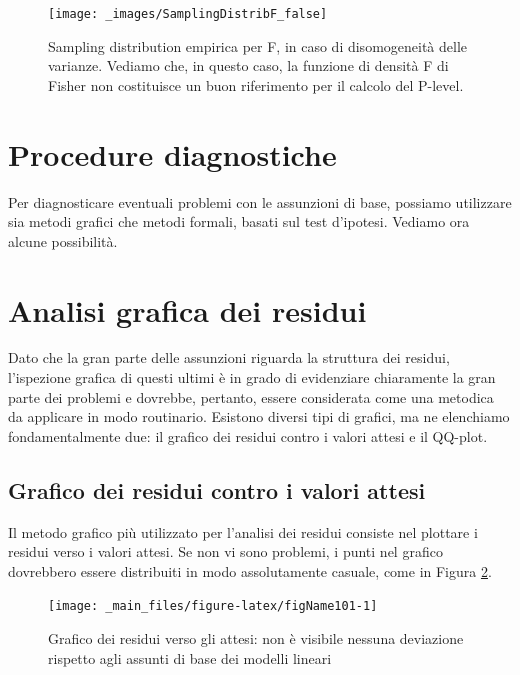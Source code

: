 \documentclass[a4paper,12pt,oneside]{book}
\begin{document}
\begin{figure}

{\centering \texttt{[image: \_images/SamplingDistribF\_false]} 

}

\caption{Sampling distribution empirica per F, in caso di disomogeneità delle varianze. Vediamo che, in questo caso, la funzione di densità F di Fisher non costituisce un buon riferimento per il calcolo del P-level.}\label{fig:figName101a}
\end{figure}

\hypertarget{procedure-diagnostiche}{%
\section{Procedure diagnostiche}\label{procedure-diagnostiche}}

Per diagnosticare eventuali problemi con le assunzioni di base, possiamo utilizzare sia metodi grafici che metodi formali, basati sul test d'ipotesi. Vediamo ora alcune possibilità.

\hypertarget{analisi-grafica-dei-residui}{%
\section{Analisi grafica dei residui}\label{analisi-grafica-dei-residui}}

Dato che la gran parte delle assunzioni riguarda la struttura dei residui, l'ispezione grafica di questi ultimi è in grado di evidenziare chiaramente la gran parte dei problemi e dovrebbe, pertanto, essere considerata come una metodica da applicare in modo routinario. Esistono diversi tipi di grafici, ma ne elenchiamo fondamentalmente due: il grafico dei residui contro i valori attesi e il QQ-plot.

\hypertarget{grafico-dei-residui-contro-i-valori-attesi}{%
\subsection{Grafico dei residui contro i valori attesi}\label{grafico-dei-residui-contro-i-valori-attesi}}

Il metodo grafico più utilizzato per l'analisi dei residui consiste nel plottare i residui verso i valori attesi. Se non vi sono problemi, i punti nel grafico dovrebbero essere distribuiti in modo assolutamente casuale, come in Figura \ref{fig:figName101}.

\begin{figure}

{\centering \texttt{[image: \_main\_files/figure-latex/figName101-1]} 

}

\caption{Grafico dei residui verso gli attesi: non è visibile nessuna deviazione rispetto agli assunti di base dei modelli lineari}\label{fig:figName101}
\end{figure}
\end{document}

